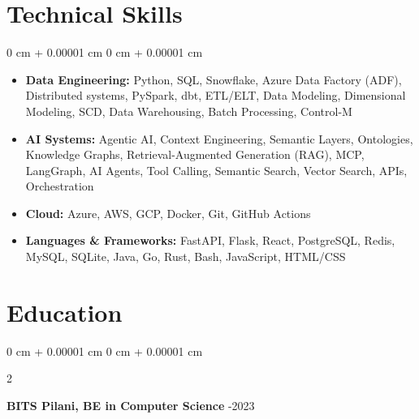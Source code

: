 \documentclass[10pt, letterpaper]{article}
\newenvironment{highlights}{
    \begin{itemize}[
        topsep=0.10 cm,
        parsep=0.10 cm,
        partopsep=0pt,
        itemsep=0pt,
        leftmargin=0 cm + 10pt
    ]
}{
    \end{itemize}
}
\newenvironment{onecolentry}{
    \begin{adjustwidth}{
        0 cm + 0.00001 cm
    }{
        0 cm + 0.00001 cm
    }
}{
    \end{adjustwidth}
}
\newenvironment{twocolentry}[2][]{
    \onecolentry
    \def\secondColumn{#2}
    \setcolumnwidth{\fill, 4.5 cm}
    \begin{paracol}{2}
}{
    \switchcolumn \raggedleft \secondColumn
    \end{paracol}
    \endonecolentry
}
\begin{document}
\section{Technical Skills}

\begin{onecolentry}
\begin{highlights}

\item \textbf{Data Engineering:} Python, SQL, Snowflake, Azure Data Factory (ADF), Distributed systems, PySpark, dbt, ETL/ELT, Data Modeling, Dimensional Modeling, SCD, Data Warehousing, Batch Processing, Control-M

\item \textbf{AI Systems:} Agentic AI, Context Engineering, Semantic Layers, Ontologies, Knowledge Graphs, Retrieval-Augmented Generation (RAG), MCP, LangGraph, AI Agents, Tool Calling, Semantic Search, Vector Search, APIs, Orchestration

\item \textbf{Cloud:} Azure, AWS, GCP, Docker, Git, GitHub Actions

\item \textbf{Languages \& Frameworks:} FastAPI, Flask, React, PostgreSQL, Redis, MySQL, SQLite, Java, Go, Rust, Bash, JavaScript, HTML/CSS

\end{highlights}
\end{onecolentry}

\section{Education}

    \begin{twocolentry}{
        2019-2023
    }
        \textbf{BITS Pilani, BE in Computer Science}\end{twocolentry}

 
\end{document}
